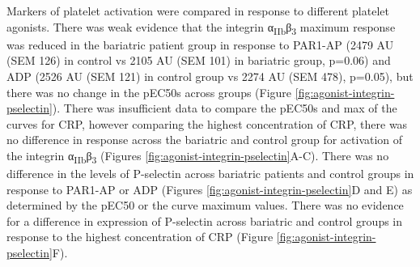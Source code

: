 \documentclass[11pt,twoside]{bristolthesis}
\begin{document}
Markers of platelet activation were compared in response to different platelet agonists. There was weak evidence that the integrin α\textsubscript{IIb}β\textsubscript{3} maximum response was reduced in the bariatric patient group in response to PAR1-AP (2479 AU (SEM 126) in control vs 2105 AU (SEM 101) in bariatric group, p=0.06) and ADP (2526 AU (SEM 121) in control group vs 2274 AU (SEM 478), p=0.05), but there was no change in the pEC50s across groups (Figure \ref{fig:agonist-integrin-pselectin}). There was insufficient data to compare the pEC50s and max of the curves for CRP, however comparing the highest concentration of CRP, there was no difference in response across the bariatric and control group for activation of the integrin α\textsubscript{IIb}β\textsubscript{3} (Figures \ref{fig:agonist-integrin-pselectin}A-C). There was no difference in the levels of P-selectin across bariatric patients and control groups in response to PAR1-AP or ADP (Figures \ref{fig:agonist-integrin-pselectin}D and E) as determined by the pEC50 or the curve maximum values. There was no evidence for a difference in expression of P-selectin across bariatric and control groups in response to the highest concentration of CRP (Figure \ref{fig:agonist-integrin-pselectin}F).
\end{document}
